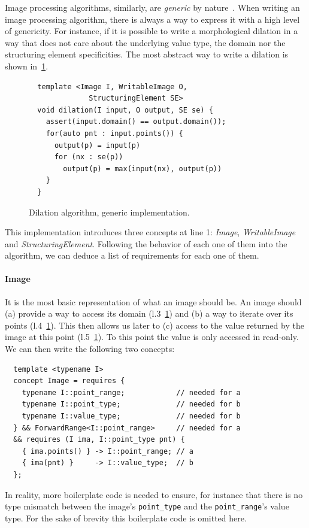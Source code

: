 Image processing algorithms, similarly, are \emph{generic} by
nature~\parencite{ritter.1990.cvgi,geraud.2000.icpr,darbon.2002.ismm,levillain.2010.icip,levillain.2014.ciarp}. When
writing an image processing algorithm, there is always a way to express it with a high level of genericity. For
instance, if it is possible to write a morphological dilation in a way that does not care about the underlying value
type, the domain nor the structuring element specificities. The most abstract way to write a dilation is shown
in~\cref{code:gen.dilate}.

\begin{figure}[htbp]
  \centering
  \begin{verbatim}
  template <Image I, WritableImage O,
              StructuringElement SE>
  void dilation(I input, O output, SE se) {
    assert(input.domain() == output.domain());
    for(auto pnt : input.points()) {
      output(p) = input(p)
      for (nx : se(p))
        output(p) = max(input(nx), output(p))
    }
  }
  \end{verbatim}
  \caption{Dilation algorithm, generic implementation.}
  \label{code:gen.dilate}
\end{figure}

This implementation introduces three concepts at line 1: \emph{Image}, \emph{WritableImage} and
\emph{StructuringElement}. Following the behavior of each one of them into the algorithm, we can deduce a list of
requirements for each one of them.

\paragraph{Image} It is the most basic representation of what an image should be. An image should (a) provide a way to
access its domain (l.3~\cref{code:gen.dilate}) and (b) a way to iterate over its points (l.4~\cref{code:gen.dilate}).
This then allows us later to (c) access to the value returned by the image at this point (l.5~\cref{code:gen.dilate}).
To this point the value is only accessed in read-only. We can then write the following two concepts:
\begin{verbatim}
  template <typename I>
  concept Image = requires {
    typename I::point_range;            // needed for a
    typename I::point_type;             // needed for b
    typename I::value_type;             // needed for b
  } && ForwardRange<I::point_range>     // needed for a
  && requires (I ima, I::point_type pnt) {
    { ima.points() } -> I::point_range; // a
    { ima(pnt) }     -> I::value_type;  // b
  };
\end{verbatim}
In reality, more boilerplate code is needed to ensure, for instance that there is no type mismatch between the image's
\texttt{point\_type} and the \texttt{point\_range}'s value type. For the sake of brevity this boilerplate code is
omitted here.

